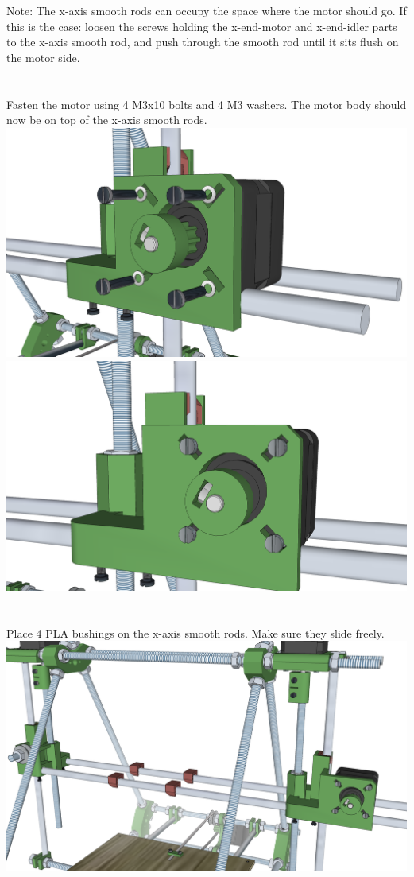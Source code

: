 \documentclass[twoside,openany,a4paper,titlepage]{memoir}
\begin{document}
	Note: The x-axis smooth rods can occupy the space where the motor should go.
	If this is the case: loosen the screws holding the x-end-motor and x-end-idler parts to
	the x-axis smooth rod, and push through the smooth rod until it sits flush on the motor
	side.
	
	\section{}
	Fasten the motor using 4 M3x10 bolts and 4 M3 washers. The motor body should now be on top of the
	x-axis smooth rods.\\
	\includegraphics[width=1\linewidth]{graphics/ch9_6_1.png}
	\includegraphics[width=1\linewidth]{graphics/ch9_6_2.png}
	
	\section{}
	Place 4 PLA bushings on the x-axis smooth rods. Make sure they slide freely.\\
	\includegraphics[width=1\linewidth]{graphics/ch9_7.png}
	
\end{document}
